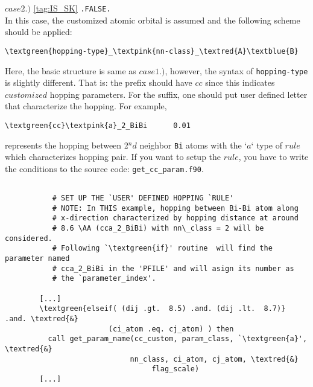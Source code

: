 \documentclass[a4paper,12pt]{scrartcl}
\newcommand{\textred}[1]{\textcolor{red!85!white}{\texttt{#1}}}
\newcommand{\textblue}[1]{\textcolor{blue!85!white}{\texttt{#1}}}
\newcommand{\textgreen}[1]{\textcolor{green!50!black}{\texttt{#1}}}
\newcommand{\textpink}[1]{\textcolor{red!60!yellow}{\texttt{#1}}}
\begin{document}
\begin{description}
		\subitem $case 2.)$ \ref{tag:IS_SK} \texttt{.FALSE.} \\
		In this case, the customized atomic orbital is assumed and the 
		following scheme should be applied:
        \begin{Verbatim}[commandchars=\\\{\}]
         \textgreen{hopping-type}_\textpink{nn-class}_\textred{A}\textblue{B}
        \end{Verbatim}
		Here, the basic structure is same as $case 1.)$, however, the syntax of 
		\textgreen{hopping-type} is slightly different. 
		That is: the prefix should have \textgreen{$cc$} since this indicates $customized$ 
		hopping parameters. For the suffix, one should put user defined 
		letter that characterize the hopping.	
		For example,
        \begin{Verbatim}[commandchars=\\\{\}]
         \textgreen{cc}\textpink{a}_2_BiBi      0.01
        \end{Verbatim}
		represents the hopping between 2$^nd$ neighbor \texttt{Bi} atoms with
		the `\textpink{$a$}` type of $rule$ which characterizes hopping pair.
		If you want to setup the $rule$, you have to write the conditions
		to the source code: \texttt{get\_cc\_param.f90}.
	

	
\begin{Verbatim}[commandchars=\\\{\},gobble=4, frame=single, framesep=2mm, 
    label= source code example: get\_cc\_param.f90,
    labelposition=bottomline]

		   # SET UP THE `USER' DEFINED HOPPING `RULE'
		   # NOTE: In THIS example, hopping between Bi-Bi atom along 
		   # x-direction characterized by hopping distance at around 
		   # 8.6 \AA (cca_2_BiBi) with nn\_class = 2 will be considered.
		   # Following `\textgreen{if}' routine  will find the parameter named 
		   # cca_2_BiBi in the 'PFILE' and will asign its number as 
		   # the `parameter_index'.

	   	[...]
        \textgreen{elseif( (dij .gt.  8.5) .and. (dij .lt.  8.7)} .and. \textred{&}
					    (ci_atom .eq. cj_atom) ) then 
    	  call get_param_name(cc_custom, param_class, `\textgreen{a}', \textred{&} 
			  			     nn_class, ci_atom, cj_atom, \textred{&}
							      flag_scale)
	   	[...]


\end{Verbatim}
\end{description}
\end{document}
